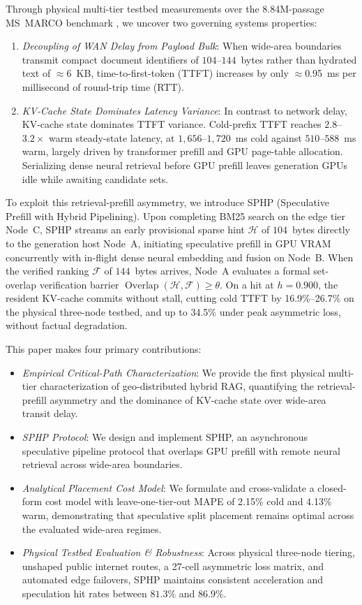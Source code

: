 \documentclass[conference,a4paper]{IEEEtran}
\begin{document}
Through physical multi-tier testbed measurements over the 8.84M-passage MS~MARCO benchmark \cite{bajaj2018msmarco}, we uncover two governing systems properties:
\begin{enumerate}
    \item \textit{Decoupling of WAN Delay from Payload Bulk}: When wide-area boundaries transmit compact document identifiers of $104$--$144$~bytes rather than hydrated text of $\approx$6~KB, time-to-first-token (TTFT) increases by only $\approx$0.95~ms per millisecond of round-trip time (RTT).
    \item \textit{KV-Cache State Dominates Latency Variance}: In contrast to network delay, KV-cache state dominates TTFT variance. Cold-prefix TTFT reaches $2.8$--$3.2\times$ warm steady-state latency, at $1{,}656$--$1{,}720$~ms cold against $510$--$588$~ms warm, largely driven by transformer prefill and GPU page-table allocation. Serializing dense neural retrieval before GPU prefill leaves generation GPUs idle while awaiting candidate sets.
\end{enumerate}

To exploit this retrieval-prefill asymmetry, we introduce SPHP (Speculative Prefill with Hybrid Pipelining). Upon completing BM25 search on the edge tier Node~C, SPHP streams an early provisional sparse hint $\mathcal{H}$ of $104$~bytes directly to the generation host Node~A, initiating speculative prefill in GPU VRAM concurrently with in-flight dense neural embedding and fusion on Node~B. When the verified ranking $\mathcal{F}$ of $144$~bytes arrives, Node~A evaluates a formal set-overlap verification barrier $\operatorname{Overlap}(\mathcal{H}, \mathcal{F}) \ge \theta$. On a hit at $h=0.900$, the resident KV-cache commits without stall, cutting cold TTFT by 16.9\%--26.7\% on the physical three-node testbed, and up to 34.5\% under peak asymmetric loss, without factual degradation.

This paper makes four primary contributions:
\begin{itemize}
    \item \textit{Empirical Critical-Path Characterization}: We provide the first physical multi-tier characterization of geo-distributed hybrid RAG, quantifying the retrieval-prefill asymmetry and the dominance of KV-cache state over wide-area transit delay.
    \item \textit{SPHP Protocol}: We design and implement SPHP, an asynchronous speculative pipeline protocol that overlaps GPU prefill with remote neural retrieval across wide-area boundaries.
    \item \textit{Analytical Placement Cost Model}: We formulate and cross-validate a closed-form cost model with leave-one-tier-out MAPE of 2.15\% cold and 4.13\% warm, demonstrating that speculative split placement remains optimal across the evaluated wide-area regimes.
    \item \textit{Physical Testbed Evaluation \& Robustness}: Across physical three-node tiering, unshaped public internet routes, a 27-cell asymmetric loss matrix, and automated edge failovers, SPHP maintains consistent acceleration and speculation hit rates between $81.3\%$ and $86.9\%$.
\end{itemize}
\end{document}
